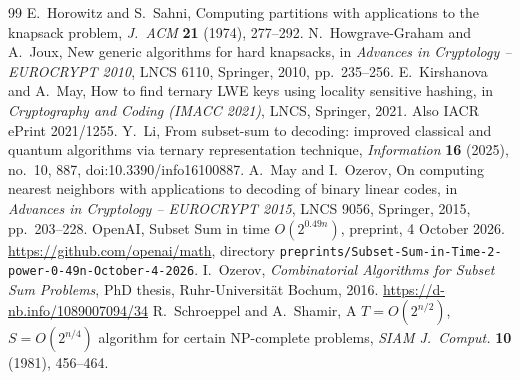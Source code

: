 \documentclass[11pt]{article}
\theoremstyle{definition}
\theoremstyle{remark}
\begin{document}
\begin{thebibliography}{99}
 E.~Horowitz and S.~Sahni, Computing partitions with applications to the knapsack problem,
\emph{J.\ ACM} \textbf{21} (1974), 277--292.
 N.~Howgrave-Graham and A.~Joux, New generic algorithms for hard knapsacks, in \emph{Advances in
Cryptology -- EUROCRYPT 2010}, LNCS 6110, Springer, 2010, pp.~235--256.
 E.~Kirshanova and A.~May, How to find ternary LWE keys using locality sensitive hashing, in
\emph{Cryptography and Coding (IMACC 2021)}, LNCS, Springer, 2021. Also IACR ePrint 2021/1255.
 Y.~Li, From subset-sum to decoding: improved classical and quantum algorithms via ternary
representation technique, \emph{Information} \textbf{16} (2025), no.~10, 887, doi:10.3390/info16100887.
 A.~May and I.~Ozerov, On computing nearest neighbors with applications to decoding of binary linear
codes, in \emph{Advances in Cryptology -- EUROCRYPT 2015}, LNCS 9056, Springer, 2015, pp.~203--228.
 OpenAI, Subset Sum in time $O(2^{0.49n})$, preprint, 4 October 2026.
\url{https://github.com/openai/math}, directory \texttt{preprints/Subset-Sum-in-Time-2-power-0-49n-October-4-2026}.
 I.~Ozerov, \emph{Combinatorial Algorithms for Subset Sum Problems}, PhD thesis, Ruhr-Universit\"at
Bochum, 2016. \url{https://d-nb.info/1089007094/34}
 R.~Schroeppel and A.~Shamir, A $T=O(2^{n/2})$, $S=O(2^{n/4})$ algorithm for certain NP-complete
problems, \emph{SIAM J.\ Comput.} \textbf{10} (1981), 456--464.
\end{thebibliography}
\end{document}
